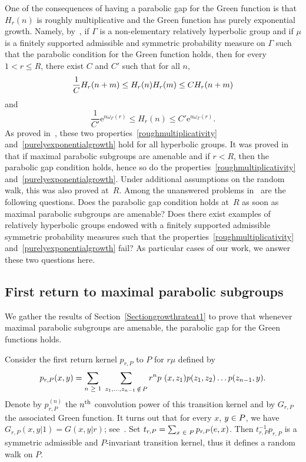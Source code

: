 \documentclass[AHL,Unicode,longabstracts]{cedram}
\newcommand{\rme}{\mathrm{e}}
\let\oldin\in
\renewcommand{\in}{\mathchoice{\oldin}{\oldin}{\,\oldin\,}{\,\oldin\,}}
\let\oldge\ge
\renewcommand{\ge}{\mathchoice{\oldge}{\oldge}{\,\oldge\,}{\,\oldge\,}}
\let\oldle\le
\renewcommand{\le}{\mathchoice{\oldle}{\oldle}{\,\oldle\,}{\,\oldle\,}}
\begin{document}
One of the consequences of having a parabolic gap for the Green function is that $H_r(n)$ is roughly multiplicative and the Green function has purely exponential growth. Namely, by~\cite[Theorem~1.8]{DWY}, if $\Gamma$ is a non-elementary relatively hyperbolic group and if $\mu$ is a finitely supported admissible and symmetric probability measure on $\Gamma$ such that the parabolic condition for the Green function holds, then for every $1<r\leq R$, there exist $C$ and $C'$ such that for all $n$,
\begin{equation}\label{roughmultiplicativity}
\frac{1}{C}H_{r} (n+m)\leq H_r(n)H_r(m)\le C H_{r} (n+m)
\end{equation}
and
\begin{equation}\label{purelyexponentialgrowth}
\frac{1}{C'}\rme^{n\omega_\Gamma(r)}\leq H_r(n)\leq C' \rme^{n\omega_\Gamma(r)}.
\end{equation}
As proved in~\cite{SWX}, these two properties~\eqref{roughmultiplicativity} and~\eqref{purelyexponentialgrowth} hold for all hyperbolic groups. It was proved in~\cite{DWY} that if maximal parabolic subgroups are amenable and if $r<R$, then the parabolic gap condition holds, hence so do the properties~\eqref{roughmultiplicativity} and~\eqref{purelyexponentialgrowth}. Under additional assumptions on the random walk, this was also proved at~$R$. Among the unanswered problems in~\cite{DWY} are the following questions. Does the parabolic gap condition holds at~$R$ as soon as maximal parabolic subgroups are amenable? Does there exist examples of relatively hyperbolic groups endowed with a finitely supported admissible symmetric probability measures such that the properties~\eqref{roughmultiplicativity} and~\eqref{purelyexponentialgrowth} fail? As particular cases of our work, we answer these two questions here.

\subsection{First return to maximal parabolic subgroups}

We gather the results of Section~\ref{Sectiongrowthrateat1} to prove that whenever maximal parabolic subgroups are amenable, the parabolic gap for the Green functions holds.


Consider the first return kernel $p_{r,P}$ to $P$ for $r \mu$ defined by
\[
p_{r,P}(x,y)=\sum_{n\ge 1}\;\sum_{z_1, \ldots,z_{n-1}\notin P} r^n p~(x,z_1)p(z_1,z_2) \dots p(z_{n-1},y).
\]
Denote by $p_{r, P}^{(n)}$ the $n^{\rm th}$ convolution power of this transition kernel and by $G_{r,P}$ the associated Green function. It turns out that for every $x$, $y\in P$, we have $G_{r,P}(x,y|1)=G(x,y|r)$; see~\cite[Lemma~4.4]{DG21}. Set $t_{r, P} = \sum_{x \in P} p_{r, P}(e, x)$. Then $t_{r, P}^{-1} p_{r, P}$ is a symmetric admissible and $P$-invariant transition kernel, thus it defines a random walk on $P$.
\end{document}
